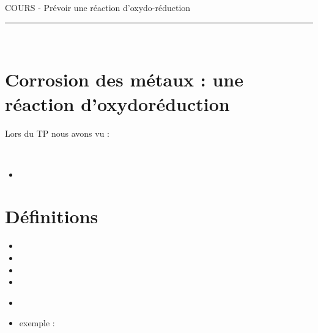 \documentclass[11pt,a4paper]{article}
\newcommand{\cadreblanc}[1]{%
\medskip\framebox[\linewidth][c]{%
\rule{0mm}{#1mm}}\par
\medskip}
\begin{document}
\center \LARGE{COURS - Prévoir une réaction d'oxydo-réduction}
\\[0,3cm]

\normalsize

\hrule\
\\[1cm]

\flushleft
\section{Corrosion des métaux : une réaction d'oxydoréduction}

Lors du TP nous avons vu :

\vspace{0.8cm}

\dotfill \\[5mm] \dotfill 

\vspace{0.8cm}

\cadreblanc{30}

\vspace{0.8cm}

\begin{itemize}
\item \dotfill 

\begin{center}
  \begin{minipage}{10cm}
  \cadreblanc{10}
  \end{minipage}
\end{center}

\end{itemize}

\section{Définitions}

\begin{itemize}[leftmargin=1cm]

\vspace{2mm}

\item \dotfill 

\vspace{5mm}

\item \dotfill 

\vspace{5mm}

\item \dotfill 

\vspace{5mm}

\item \dotfill 

\vspace{5mm}

\item \dotfill \\[5mm] \dotfill 

\vspace{5mm}

\item \dotfill 

\vspace{5mm}

 exemple : ~~ \dotfill 


\end{itemize}
\end{document}
